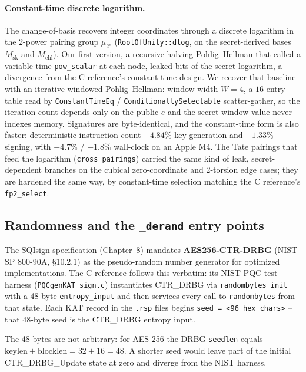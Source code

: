\paragraph{Constant-time discrete logarithm.}
The change-of-basis recovers integer coordinates through a discrete
logarithm in the $2$-power pairing group $\mu_{2^e}$
(\texttt{RootOfUnity::dlog}, on the secret-derived bases
$M_{\mathrm{sk}}$ and $M_{\mathrm{chl}}$).  Our first version, a
recursive halving Pohlig--Hellman that called a variable-time
\texttt{pow\_scalar} at each node, leaked bits of the secret logarithm,
a divergence from the C reference's constant-time design.  We recover
that baseline with an iterative windowed Pohlig--Hellman: window width
$W = 4$, a $16$-entry table read by \texttt{ConstantTimeEq} /
\texttt{ConditionallySelectable} scatter-gather, so the iteration count
depends only on the public $e$ and the secret window value never indexes
memory.  Signatures are byte-identical, and the constant-time form is
also faster: deterministic instruction count $-4.84\%$ key generation
and $-1.33\%$ signing, with $-4.7\%$ / $-1.8\%$ wall-clock on an Apple
M4.  The Tate pairings that feed the logarithm (\texttt{cross\_pairings})
carried the same kind of leak, secret-dependent branches on the cubical
zero-coordinate and 2-torsion edge cases; they are hardened the same way,
by constant-time selection matching the C reference's \texttt{fp2\_select}.

\subsection{Randomness and the \texttt{\_derand} entry points}
\label{sec:randomness}

The SQIsign specification (Chapter~8) mandates
\textbf{AES256-CTR-DRBG} (NIST SP 800-90A, \S10.2.1) as the
pseudo-random number generator for optimized implementations.  The
C reference follows this verbatim: its NIST PQC test harness
(\texttt{PQCgenKAT\_sign.c}) instantiates CTR\_DRBG via
\texttt{randombytes\_init} with a 48-byte \texttt{entropy\_input}
and then services every call to \texttt{randombytes} from that
state.  Each KAT record in the \texttt{.rsp} files begins
\texttt{seed = <96 hex chars>} -- that 48-byte seed is the
CTR\_DRBG entropy input.

The 48 bytes are not arbitrary: for AES-256 the DRBG
\texttt{seedlen} equals $\text{keylen} + \text{blocklen} =
32 + 16 = 48$.  A shorter seed would leave part of the initial
CTR\_DRBG\_Update state at zero and diverge from the NIST harness.

